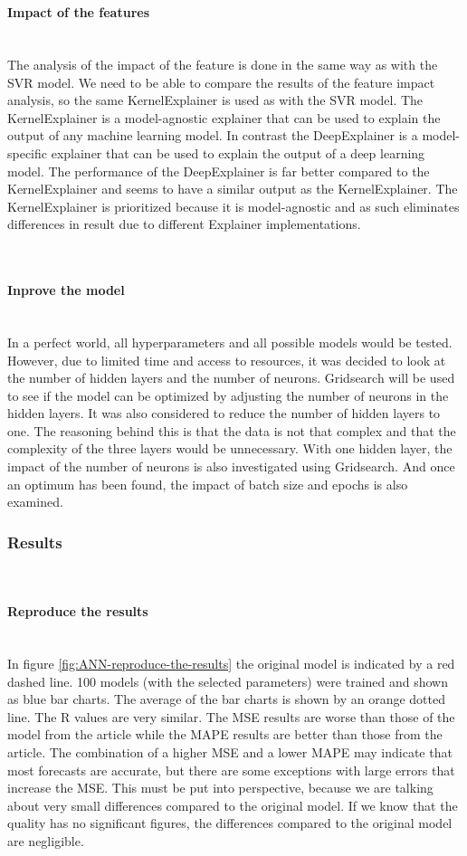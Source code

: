 \documentclass{article}
\newcommand{\subsubsubsection}[1]{%
  \paragraph{#1}\mbox{}\\}
\begin{document}
\subsubsubsection{Impact of the features}
The analysis of the impact of the feature is done in the same way as with the SVR model.
We need to be able to compare the results of the feature impact analysis, so the same KernelExplainer is used as with the SVR model.
The KernelExplainer is a model-agnostic explainer that can be used to explain the output of any machine learning model.
In contrast the DeepExplainer is a model-specific explainer that can be used to explain the output of a deep learning model.
The performance of the DeepExplainer is far better compared to the KernelExplainer and seems to have a similar output as the KernelExplainer.
The KernelExplainer is prioritized because it is model-agnostic and as such eliminates differences in result due to different Explainer implementations.



\subsubsubsection{Inprove the model}
In a perfect world, all hyperparameters and all possible models would be tested. However, due to limited time and access to resources, it was decided to look at the number of hidden layers and the number of neurons.
Gridsearch will be used to see if the model can be optimized by adjusting the number of neurons in the hidden layers.
It was also considered to reduce the number of hidden layers to one. The reasoning behind this is that the data is not that complex and that the complexity of the three layers would be unnecessary. With one hidden layer, the impact of the number of neurons is also investigated using Gridsearch. And once an optimum has been found, the impact of batch size and epochs is also examined.

\subsubsection{Results}

\subsubsubsection{Reproduce the results}

In figure \ref{fig:ANN-reproduce-the-results} the original model is indicated by a red dashed line. 100 models (with the selected parameters) were trained and shown as blue bar charts. The average of the bar charts is shown by an orange dotted line.
The R values are very similar. The MSE results are worse than those of the model from the article while the MAPE results are better than those from the article.
The combination of a higher MSE and a lower MAPE may indicate that most forecasts are accurate, but there are some exceptions with large errors that increase the MSE.
This must be put into perspective, because we are talking about very small differences compared to the original model. If we know that the quality has no significant figures, the differences compared to the original model are negligible.
\end{document}

